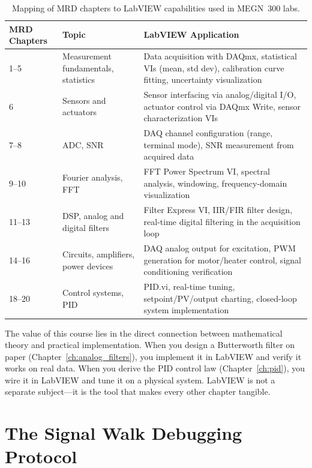 \begin{table}[htbp]\centering\small
\begin{tabularx}{\textwidth}{l l X}
\toprule
\textbf{MRD Chapters} & \textbf{Topic} & \textbf{LabVIEW Application} \\
\midrule
1--5 & Measurement fundamentals, statistics & Data acquisition with DAQmx, statistical VIs (mean, std dev), calibration curve fitting, uncertainty visualization \\
6 & Sensors and actuators & Sensor interfacing via analog/digital I/O, actuator control via DAQmx Write, sensor characterization VIs \\
7--8 & ADC, SNR & DAQ channel configuration (range, terminal mode), SNR measurement from acquired data \\
9--10 & Fourier analysis, FFT & FFT Power Spectrum VI, spectral analysis, windowing, frequency-domain visualization \\
11--13 & DSP, analog and digital filters & Filter Express VI, IIR/FIR filter design, real-time digital filtering in the acquisition loop \\
14--16 & Circuits, amplifiers, power devices & DAQ analog output for excitation, PWM generation for motor/heater control, signal conditioning verification \\
18--20 & Control systems, PID & PID.vi, real-time tuning, setpoint/PV/output charting, closed-loop system implementation \\
\bottomrule
\end{tabularx}
\caption{Mapping of MRD chapters to LabVIEW capabilities used in MEGN~300 labs.}
\label{tab:lv_course_map}
\end{table}

\begin{keyconceptbox}
The value of this course lies in the direct connection between mathematical theory and practical implementation. When you design a Butterworth filter on paper (Chapter~\ref{ch:analog_filters}), you implement it in LabVIEW and verify it works on real data. When you derive the PID control law (Chapter~\ref{ch:pid}), you wire it in LabVIEW and tune it on a physical system. LabVIEW is not a separate subject---it is the tool that makes every other chapter tangible.
\end{keyconceptbox}

\section{The Signal Walk Debugging Protocol}
\label{sec:lv_signal_walk}

